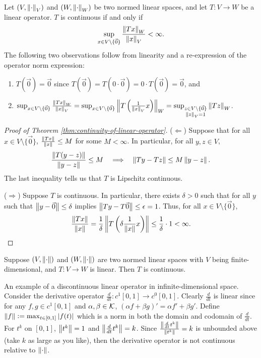 \begin{theorem}
\label{thm:continuity-of-linear-operator}
Let $(V, \left\lVert\cdot\right\rVert_V)$ and $(W, \left\lVert\cdot\right\rVert_W)$ be two normed linear spaces, and let $T: V \rightarrow W$ be a linear operator. $T$ is continuous if and only if
$$
\sup_{x \in V\setminus\{\Vec{0}\}} \frac{\left\lVert Tx\right\rVert_W}{\left\lVert x\right\rVert_V} < \infty.
$$
The following two observations follow from linearity and a re-expression of the operator norm expression:
\begin{enumerate}
    \item $T(\Vec{0}) = \Vec{0}$ since $T(\Vec{0}) = T(0 \cdot \Vec{0}) = 0 \cdot T(\Vec{0}) = \Vec{0}$, and
    \item $\sup_{x \in V\setminus\{\Vec{0}\}} \frac{\left\lVert Tx\right\rVert_W}{\left\lVert x\right\rVert_V} = \sup_{x \in V\setminus\{\Vec{0}\}} \left\lVert T\left(\frac{1}{\left\lVert x\right\rVert_V} x\right)\right\rVert_W = \sup_{\substack{z \in V\setminus\{\Vec{0}\} \\ \left\lVert z\right\rVert_V = 1}} \left\lVert Tz\right\rVert_W$. 
\end{enumerate}
\end{theorem}

\begin{proof}[Proof of Theorem \ref{thm:continuity-of-linear-operator}]
($\Longleftarrow$) Suppose that for all $x \in V \setminus \{\Vec{0}\}$, $\frac{\left\lVert Tx\right\rVert}{\left\lVert x\right\rVert} \leq M$ for some $M < \infty$. In particular, for all $y, z \in V$,
\[
    \frac{\left\lVert T(y-z)\right\rVert}{\left\lVert y-z\right\rVert} \leq M 
        \quad \Longrightarrow \quad
    \left\lVert Ty - Tz\right\rVert \leq M\left\lVert y-z\right\rVert.
\]
The last inequality tells us that $T$ is Lipschitz continuous.

($\Longrightarrow$) Suppose $T$ is continuous. In particular, there exists $\delta > 0$ such that for all $y$ such that $\left\lVert y - \Vec{0}\right\rVert \leq \delta$ implies $\left\lVert Ty - T\Vec{0}\right\rVert \leq \epsilon = 1$. Thus, for all $x \in V \setminus \{\Vec{0}\}$,
$$
\frac{\left\lVert Tx\right\rVert}{\left\lVert x\right\rVert} = \frac{1}{\delta}\left\lVert T\left(\delta\frac{1}{\left\lVert x\right\rVert}x\right)\right\rVert \leq \frac{1}{\delta} \cdot 1 < \infty.
$$
\end{proof}

\begin{theorem}
\label{thm:fin-dim-NLS-continuous-operators}
Suppose $(V, \left\lVert\cdot\right\rVert)$ and $(W, \left\lVert\cdot\right\rVert)$ are two normed linear spaces with $V$ being finite-dimensional, and $T: V \rightarrow W$ is linear. Then $T$ is continuous.
\end{theorem}

\begin{example}
An example of a discontinuous linear operator in infinite-dimensional space. Consider the derivative operator $\frac{d}{dt}: c^1[0,1] \rightarrow c^0[0,1]$. Clearly $\frac{d}{dt}$ is linear since for any $f,g \in c^1[0,1]$ and $\alpha, \beta \in \mathcal{K}$, $(\alpha f + \beta g)' = \alpha f' + \beta g'$. Define $\left\lVert f\right\rVert \vcentcolon= \max_{t \in [0,1]} |f(t)|$ which is a norm in both the domain and codomain of $\frac{d}{dt}$. For $t^k$ on $[0,1]$, $\left\lVert t^k\right\rVert = 1$ and $\left\lVert\frac{d}{dt}t^k\right\rVert = k$. Since $\frac{\left\lVert\frac{d}{dt} t^k\right\rVert}{\left\lVert t^k\right\rVert} = k$ is unbounded above (take $k$ as large as you like), then the derivative operator is not continuous relative to $\left\lVert\cdot\right\rVert$.
\end{example}

